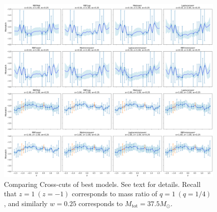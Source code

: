 \documentclass[12pt]{article}
\begin{document}
\begin{figure}[H]
    \centering
    \includegraphics[width=1\textwidth]{LatexPlots/final_gps_plots/gps_crosscuts_bestmodels.png}
    \caption{Comparing Cross-cuts of best models. See text for details. Recall that $z=1\ (z=-1)$ corresponds
    to mass ratio of $q=1\ (q=1/4)$, and similarly $w=0.25$ corresponds to $M_\text{tot}=37.5M_\odot$.}
    \label{fig:crosscuts_bestmodels}
\end{figure}
\end{document}
